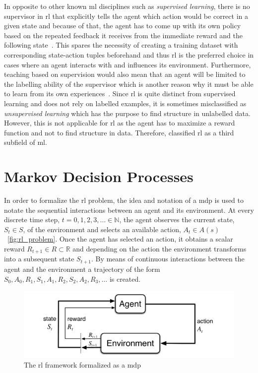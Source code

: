 \documentclass[draft,final]{vutinfth} %
\begin{document}
    In opposite to other known \gls{ml} disciplines such as \textit{supervised learning}, there is no supervisor in \gls{rl} that explicitly tells the agent which action would be correct in a given state and because of that, the agent has to come up with its own policy based on the repeated feedback it receives from the immediate reward and the following state~\citep{kaelbling_reinforcement_1996}.
    This spares the necessity of creating a training dataset with corresponding state-action tuples beforehand and thus \gls{rl} is the preferred choice in cases where an agent interacts with and influences its environment.
    Furthermore, teaching based on supervision would also mean that an agent will be limited to the labelling ability of the supervisor which is another reason why it must be able to learn from its own experiences~\citep{silver_lecture_2015-2}.
    Since \gls{rl} is quite distinct from supervised learning and does not rely on labelled examples, it is sometimes misclassified as \textit{unsupervised learning} which has the purpose to find structure in unlabelled data.
    However, this is not applicable for \gls{rl} as the agent has to maximize a reward function and not to find structure in data.
    Therefore, \citeauthor{sutton_reinforcement_2018} classified \gls{rl}  as a third subfield of \gls{ml}.


    \section{Markov Decision Processes}
    In order to formalize the \gls{rl} problem, the idea and notation of a \gls{mdp} is used to notate the sequential interactions between an agent and its environment.
    At every discrete time step, $t = 0,1,2,3, \ldots \in \mathbb{N}$, the agent observes the current state, $S_t \in \mathit{S}$, of the environment and selects an available action, $A_t \in \mathit{A}(s)$~\eqref{fig:rl_problem}.
    Once the agent has selected an action, it obtains a scalar reward $R_{t+1} \in \mathit{R} \subset \mathbb{R}$ and depending on the action the environment transforms into a subsequent state $S_{t+1}$.
    By means of continuous interactions between the agent and the environment a trajectory of the form $S_0,A_0,R_1,S_1,A_1,R_2,S_2,A_2,R_3,\ldots$ is created.

    \begin{figure}[h]
        \centering
        \includegraphics[width=\textwidth]{figures/rl_problem.png}
        \caption[The \gls{rl} framework formalized as a \gls{mdp}]{The \gls{rl} framework formalized as a \gls{mdp}\protect\footnotemark}
        \label{fig:rl_problem}
    \end{figure}
\end{document}
